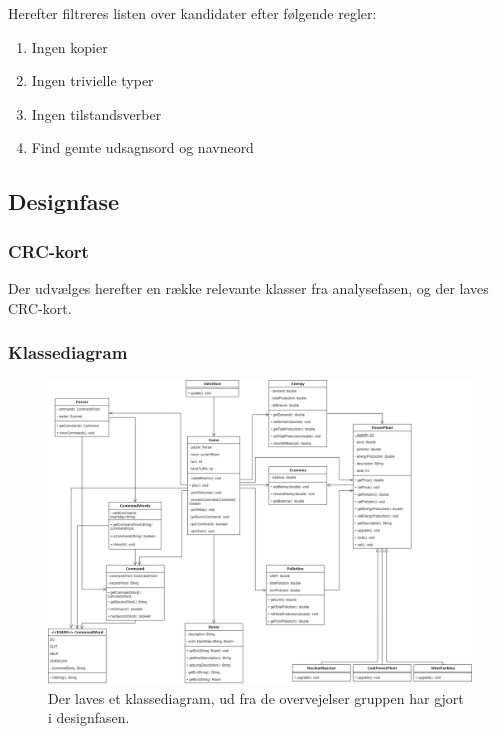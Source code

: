 \documentclass[a4paper,12pt]{report}
\begin{document}
Herefter filtreres listen over kandidater efter følgende regler:
\begin{enumerate}
	\item Ingen kopier
	\item Ingen trivielle typer
	\item Ingen tilstandsverber
	\item Find gemte udsagnsord og navneord
\end{enumerate}

\subsection{Designfase}
\subsubsection{CRC-kort}
Der udvælges herefter en række relevante klasser fra analysefasen, og der laves CRC-kort.\\

\subsubsection{Klassediagram}
\begin{figure}[H]
	\includegraphics[width=\linewidth]{images/uml_1.png}
	\caption{Der laves et klassediagram, ud fra de overvejelser gruppen har gjort i designfasen.}
	\label{fig:uml}
\end{figure}



\end{document}

